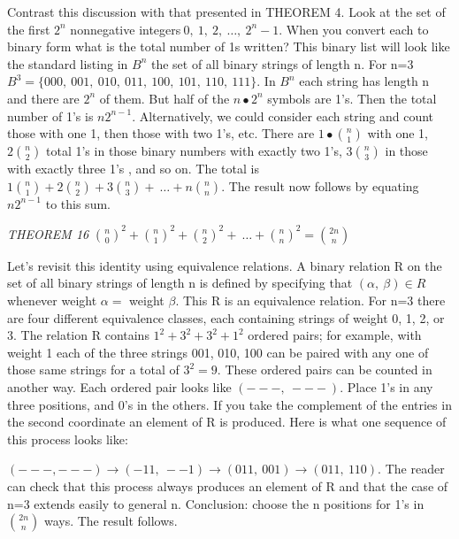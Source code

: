 \documentclass[10pt,letter]{article}
\begin{document}
Contrast this discussion with that presented in THEOREM 4. Look at the
set of the first \(2^{n}\) nonnegative
integers\(\ 0,\ 1,\ 2,\ \ldots,\ 2^{n} - 1\). When you convert each to
binary form what is the total number of 1s written? This binary list
will look like the standard listing in \(B^{n}\) the set of all binary
strings of length n. For n=3
\(B^{3} = \{ 000,\ 001,\ 010,\ 011,\ 100,\ 101,\ 110,\ 111\}\). In
\(B^{n}\) each string has length n and there are \(2^{n}\) of them. But
half of the \(n \bullet 2^{n}\) symbols are 1's. Then the total number
of 1's is \(n2^{n - 1}\). Alternatively, we could consider each string
and count those with one 1, then those with two 1's, etc. There are
\(1 \bullet
\binom{n}{1}
\) with one 1, \(2
\binom{n}{2}
\) total 1's in those binary numbers with exactly two 1's,
\(3
\binom{n}{3}
\) in those with exactly three 1's , and so on. The total
is \(1
\binom{n}{1}
 + 2
\binom{n}{2}
 + 3
\binom{n}{3}
 + \ \ldots + n
\binom{n}{n}
\text{.\ }\)The result now follows by equating
\(n2^{n - 1}\) to this sum.

\emph{THEOREM 16} \(\binom{n}{0}
^{2} +
\binom{n}{1}
^{2} +
\binom{n}{2}
^{2} + \ \ldots +
\binom{n}{n}
^{2} =
\binom{2n}{n}
\)

Let's revisit this identity using equivalence relations. A binary
relation R on the set of all binary strings of length n is defined by
specifying that \(\left( \alpha,\ \beta \right) \in R\) whenever weight
\(\alpha =\) weight \(\beta\). This R is an equivalence relation. For
n=3 there are four different equivalence classes, each containing
strings of weight 0, 1, 2, or 3. The relation R contains
\(1^{2} + 3^{2} + 3^{2} + 1^{2}\) ordered pairs; for example, with
weight 1 each of the three strings 001, 010, 100 can be paired with any
one of those same strings for a total of \(3^{2} = 9\). These ordered
pairs can be counted in another way. Each ordered pair looks like
\(\left( - - - ,\  - - - \right).\) Place 1's in any three positions,
and 0's in the others. If you take the complement of the entries in the
second coordinate an element of R is produced. Here is what one sequence
of this process looks like:

\(\left( - - - , - - - \right) \rightarrow \left( - 11,\  - - 1 \right) \rightarrow \left( 011,\ 001 \right) \rightarrow (011,\ 110)\).
The reader can check that this process always produces an element of R
and that the case of n=3 extends easily to general n. Conclusion: choose
the n positions for 1's in \(\binom{2n}{n}
\) ways. The result follows.
\end{document}
